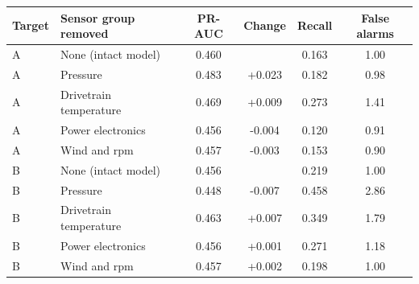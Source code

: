 \begin{tabular}{@{}llcccc@{}}
\toprule
Target & Sensor group removed & PR-AUC & Change & Recall & False alarms \\
\midrule
A & None (intact model) & 0.460 &  & 0.163 & 1.00 \\
A & Pressure & 0.483 & +0.023 & 0.182 & 0.98 \\
A & Drivetrain temperature & 0.469 & +0.009 & 0.273 & 1.41 \\
A & Power electronics & 0.456 & -0.004 & 0.120 & 0.91 \\
A & Wind and rpm & 0.457 & -0.003 & 0.153 & 0.90 \\
B & None (intact model) & 0.456 &  & 0.219 & 1.00 \\
B & Pressure & 0.448 & -0.007 & 0.458 & 2.86 \\
B & Drivetrain temperature & 0.463 & +0.007 & 0.349 & 1.79 \\
B & Power electronics & 0.456 & +0.001 & 0.271 & 1.18 \\
B & Wind and rpm & 0.457 & +0.002 & 0.198 & 1.00 \\
\bottomrule
\end{tabular}
